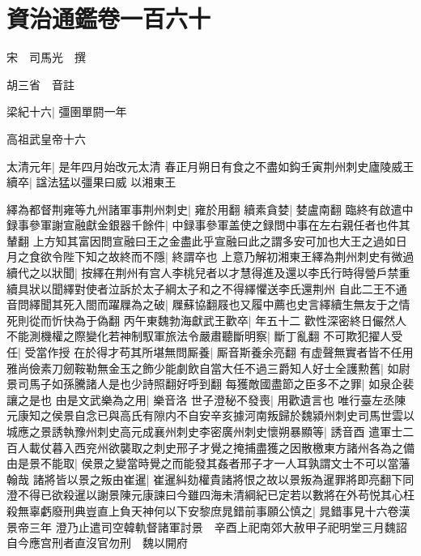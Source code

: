 \chapter{資治通鑑卷一百六十}
宋　司馬光　撰

胡三省　音註

梁紀十六|{
	彊圉單閼一年}


高祖武皇帝十六

太清元年|{
	是年四月始改元太清}
春正月朔日有食之不盡如鈎壬寅荆州刺史廬陵威王續卒|{
	諡法猛以彊果曰威}
以湘東王

繹為都督荆雍等九州諸軍事荆州刺史|{
	雍於用翻}
續素貪婪|{
	婪盧南翻}
臨終有啟遣中録事參軍謝宣融獻金銀器千餘件|{
	中録事參軍盖使之録問中事在左右親任者也件其輦翻}
上方知其富因問宣融曰王之金盡此乎宣融曰此之謂多安可加也大王之過如日月之食欲令陛下知之故終而不隱|{
	終謂卒也}
上意乃解初湘東王繹為荆州刺史有微過續代之以狀聞|{
	按繹在荆州有宫人李桃兒者以才慧得進及還以李氏行時得營戶禁重續具狀以聞繹對使者泣訴於太子綱太子和之不得繹懼送李氏還荆州}
自此二王不通音問繹聞其死入閤而躍屧為之破|{
	屧蘇協翻屐也又履中薦也史言繹續生無友于之情死則從而忻快為于偽翻}
丙午東魏勃海獻武王歡卒|{
	年五十二}
歡性深密終日儼然人不能測機權之際變化若神制馭軍旅法令嚴肅聽斷明察|{
	斷丁亂翻}
不可欺犯擢人受任|{
	受當作授}
在於得才苟其所堪無問厮養|{
	厮音斯養余亮翻}
有虚聲無實者皆不任用雅尚儉素刀劒鞍勒無金玉之飾少能劇飲自當大任不過三爵知人好士全護勲舊|{
	如尉景司馬子如孫騰諸人是也少詩照翻好呼到翻}
每獲敵國盡節之臣多不之罪|{
	如泉企裴讓之是也}
由是文武樂為之用|{
	樂音洛}
世子澄秘不發喪|{
	用歡遺言也}
唯行臺左丞陳元康知之侯景自念已與高氏有隙内不自安辛亥據河南叛歸於魏潁州刺史司馬世雲以城應之景誘執豫州刺史高元成襄州刺史李密廣州刺史懷朔暴顯等|{
	誘音酉}
遣軍士二百人載仗暮入西兖州欲襲取之刺史邢子才覺之掩捕盡獲之因散檄東方諸州各為之備由是景不能取|{
	侯景之變當時覺之而能發其姦者邢子才一人耳孰謂文士不可以當藩翰哉}
諸將皆以景之叛由崔暹|{
	崔暹糾劾權貴諸將恨之故以景叛為暹罪將即亮翻下同}
澄不得已欲殺暹以謝景陳元康諫曰今雖四海未清綱紀已定若以數將在外苟悦其心枉殺無辜虧廢刑典豈直上負天神何以下安黎庶晁錯前事願公慎之|{
	晁錯事見十六卷漢景帝三年}
澄乃止遣司空韓軌督諸軍討景　辛酉上祀南郊大赦甲子祀明堂三月魏詔自今應宫刑者直沒官勿刑　魏以開府

